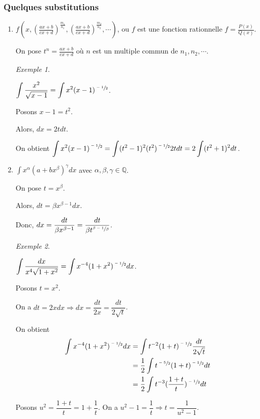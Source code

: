 \documentclass{report}
\newcommand*{\rationels}{\mathbb{Q}}
\theoremstyle{definition}
\theoremstyle{remark}
\newtheorem*{exem}{Exemple}
\begin{document}
	\subsubsection{Quelques substitutions}
	\begin{enumerate}
		\item $f\left( x,\left( \frac{ax+b}{cx+d} \right)^\frac{m_1}{n_1}, \left( \frac{ax+b}{cx+d} \right)^\frac{m_2}{n_2}, \dotsb \right)$, ou $f$ est une fonction rationnelle $f=\frac{P(x)}{Q(x)}$.

		On pose $t^n=\frac{ax+b}{cx+d}$ o\`u $n$ est un multiple commun de $n_1,n_2,\dotsb$.
		\begin{exem}
			~

			$\displaystyle\int\dfrac{x^2}{\sqrt{x-1}} = \displaystyle\int x^2(x-1)^{\sfrac{-1}{2}}$.

			Posons $x-1=t^2$.

			Alors, $dx=2t dt$.

			On obtient $\displaystyle\int x^2(x-1)^{\sfrac{-1}{2}} = \displaystyle\int (t^2-1)^2(t^2)^{\sfrac{-1}{2}}2tdt = 2 \int (t^2+1)^2 dt$.
		\end{exem}
		\item $\displaystyle\int x^\alpha(a+bx^\beta)^\gamma dx$ avec $\alpha,\beta,\gamma \in \rationels$.

		On pose $t=x^\beta$.

		Alors, $dt = \beta x^{\beta-1} dx$.

		Donc, $dx = \dfrac{dt}{\beta x^{\beta-1}} = \dfrac{dt}{\beta t^{\sfrac{\beta-1}{\beta}}}$.
		\begin{exem}~

			$\displaystyle\int\dfrac{dx}{x^4\sqrt{1+x^2}} = \displaystyle\int x^{-4}(1+x^2)^{\sfrac{-1}{2}} dx$.

			Posons $t=x^2$.

			On a $dt=2xdx \Rightarrow dx=\dfrac{dt}{2x} = \dfrac{dt}{2\sqrt{t}}$.

			On obtient
			\begin{align*}
				\int x^{-4}(1+x^2)^{\sfrac{-1}{2}} dx&= \int t^{-2} (1+t)^{\sfrac{-1}{2}} \dfrac{dt}{2\sqrt{t}}\\
				&= \dfrac{1}{2} \int t^{\sfrac{-5}{2}}(1+t)^{\sfrac{-1}{2}} dt\\
				&=\dfrac{1}{2}\int t^{-3}(\dfrac{1+t}{t})^{\sfrac{-1}{2}} dt
			\end{align*}

			Posons $u^2=\dfrac{1+t}{t} = 1+\dfrac{1}{t}$. On a $u^2-1=\dfrac{1}{t} \Rightarrow t=\dfrac{1}{u^2-1}$.


\end{exem}
\end{enumerate}
\end{document}
